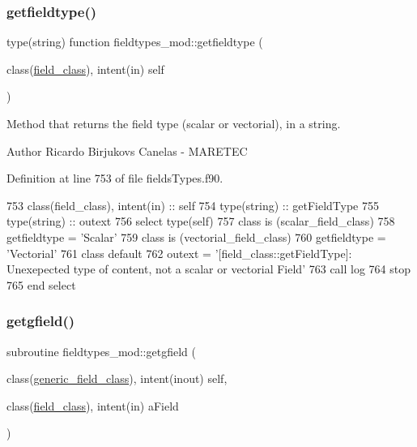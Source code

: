 \subsubsection{\texorpdfstring{getfieldtype()}{getfieldtype()}}
{\footnotesize\ttfamily type(string) function fieldtypes\+\_\+mod\+::getfieldtype (\begin{DoxyParamCaption}\item[{class(\mbox{\hyperlink{structfieldtypes__mod_1_1field__class}{field\+\_\+class}}), intent(in)}]{self }\end{DoxyParamCaption})\hspace{0.3cm}{\ttfamily [private]}}



Method that returns the field type (scalar or vectorial), in a string. 

\begin{DoxyAuthor}{Author}
Ricardo Birjukovs Canelas -\/ M\+A\+R\+E\+T\+EC 
\end{DoxyAuthor}


Definition at line 753 of file fields\+Types.\+f90.


\begin{DoxyCode}
753     \textcolor{keywordtype}{class}(field\_class), \textcolor{keywordtype}{intent(in)} :: self
754     \textcolor{keywordtype}{type}(string) :: getFieldType
755     \textcolor{keywordtype}{type}(string) :: outext
756     \textcolor{keywordflow}{select type}(self)
757 \textcolor{keywordflow}{    class is} (scalar\_field\_class)
758         getfieldtype = \textcolor{stringliteral}{'Scalar'}
759 \textcolor{keywordflow}{    class is} (vectorial\_field\_class)
760         getfieldtype = \textcolor{stringliteral}{'Vectorial'}
761 \textcolor{keywordflow}{        class default}
762         outext = \textcolor{stringliteral}{'[field\_class::getFieldType]: Unexepected type of content, not a scalar or vectorial
       Field'}
763         \textcolor{keyword}{call }log%
764         stop
765 \textcolor{keywordflow}{    end select}
\end{DoxyCode}
\mbox{\label{namespacefieldtypes__mod_a214565d2002baff775a030611630fc32}} 
\subsubsection{\texorpdfstring{getgfield()}{getgfield()}}
{\footnotesize\ttfamily subroutine fieldtypes\+\_\+mod\+::getgfield (\begin{DoxyParamCaption}\item[{class(\mbox{\hyperlink{structfieldtypes__mod_1_1generic__field__class}{generic\+\_\+field\+\_\+class}}), intent(inout)}]{self,  }\item[{class(\mbox{\hyperlink{structfieldtypes__mod_1_1field__class}{field\+\_\+class}}), intent(in)}]{a\+Field }\end{DoxyParamCaption})\hspace{0.3cm}{\ttfamily [private]}}




